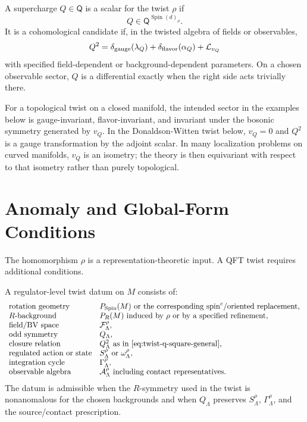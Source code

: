\begin{definition}
A supercharge \(Q\in\mathsf Q\) is a scalar for the twist \(\rho\) if
\[
  Q\in \mathsf Q^{\operatorname{Spin}(d)_\rho}.
\]
It is a cohomological candidate if, in the twisted algebra of fields or
observables,
\begin{equation}
  Q^2
  =
  \delta_{\rm gauge}(\lambda_Q)+
  \delta_{\rm flavor}(\alpha_Q)+
  \mathcal L_{v_Q}
  \label{eq:twist-q-square-general}
\end{equation}
with specified field-dependent or background-dependent parameters.  On a
chosen observable sector, \(Q\) is a differential exactly when the right side
acts trivially there.
\end{definition}

For a topological twist on a closed manifold, the intended sector in the
examples below is gauge-invariant, flavor-invariant, and invariant under the
bosonic symmetry generated by \(v_Q\).  In the Donaldson-Witten twist below,
\(v_Q=0\) and
\(Q^2\) is a gauge transformation by the adjoint scalar.  In many
localization problems on curved manifolds, \(v_Q\) is an isometry; the theory
is then equivariant with respect to that isometry rather than purely
topological.

\section{Anomaly and Global-Form Conditions}

The homomorphism \(\rho\) is a representation-theoretic input.  A QFT twist
requires additional conditions.

\begin{definition}
A regulator-level twist datum on \(M\) consists of:
\[
\begin{array}{ll}
  \text{rotation geometry} & P_{\operatorname{Spin}}(M)
      \text{ or the corresponding spin}^{c}\text{/oriented replacement},\\
  \text{\(R\)-background} & P_R(M)
      \text{ induced by }\rho\text{ or by a specified refinement},\\
  \text{field/BV space} & \mathcal F_\Lambda^\rho,\\
  \text{odd symmetry} & Q_\Lambda,\\
  \text{closure relation} & Q_\Lambda^2
      \text{ as in \eqref{eq:twist-q-square-general}},\\
  \text{regulated action or state} & S_\Lambda^\rho\text{ or }\omega_\Lambda^\rho,\\
  \text{integration cycle} & \Gamma_\Lambda^\rho,\\
  \text{observable algebra} & \mathcal A_\Lambda^\rho
      \text{ including contact representatives}.
\end{array}
\]
The datum is admissible when the \(R\)-symmetry used in the twist is
nonanomalous for the chosen backgrounds and when \(Q_\Lambda\) preserves
\(S_\Lambda^\rho\), \(\Gamma_\Lambda^\rho\), and the source/contact
prescription.
\end{definition}

